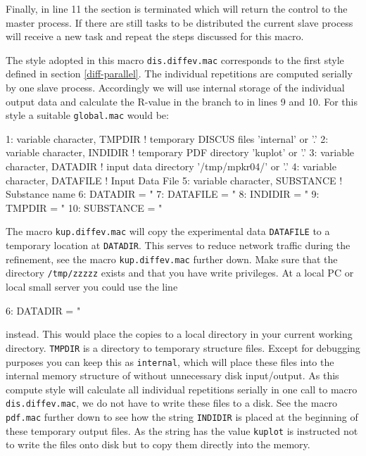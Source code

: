 Finally, in line 11 the \Discus section is terminated which will return the 
control to the master process. If there are still tasks to be distributed the 
current slave process will receive a new task and repeat the steps discussed 
for this macro.

The style adopted in this macro {\tt dis.diffev.mac} corresponds to the first
style defined in section \ref{diff-parallel}. The individual repetitions are
computed serially by one slave process. Accordingly we will use internal 
storage of the individual output data and calculate the R-value in the branch
to \Kuplot in lines 9 and 10. For this style a suitable {\tt global.mac} would be:
\begin{MacVerbatim}
 1: variable character, TMPDIR    ! temporary DISCUS files   'internal'     or '.'
 2: variable character, INDIDIR   ! temporary PDF directory  'kuplot'       or '.'
 3: variable character, DATADIR   ! input data directory     '/tmp/mpkr04/' or '.'
 4: variable character, DATAFILE  ! Input Data File  
 5: variable character, SUBSTANCE ! Substance name
 6: DATADIR   = "%
 7: DATAFILE  = "%
 8: INDIDIR   = "%
 9: TMPDIR    = "%
10: SUBSTANCE = "%
\end{MacVerbatim}

The \Kuplot macro {\tt kup.diffev.mac} will copy the experimental data 
{\tt DATAFILE} to a temporary
location at {\tt DATADIR}. This serves to reduce network traffic during the refinement,
see the macro {\tt kup.diffev.mac} further down. Make sure that the directory
{\tt /tmp/zzzzz} exists and that you have write privileges. At a local PC or local
small server you could use the line 
\begin{MacVerbatim}
 6: DATADIR   = "%
\end{MacVerbatim}
instead. This would place the copies to a local directory in your current 
working directory.   {\tt TMPDIR} is a directory to 
temporary \Discus structure files. Except for debugging purposes you can keep this
as {\tt internal}, which will place these files into the internal memory structure
of \Discus without unnecessary disk input/output. As this compute style will calculate
all individual repetitions serially in one call to macro {\tt dis.diffev.mac}, we
do not have to write these files to a disk. See the macro {\tt pdf.mac} further
down to see how the string {\tt INDIDIR} 
is placed at the beginning of these temporary  output files.  As the string has the 
value {\tt kuplot} \Discus is instructed not to write the files onto disk but to copy 
them directly into the  \Kuplot memory.

